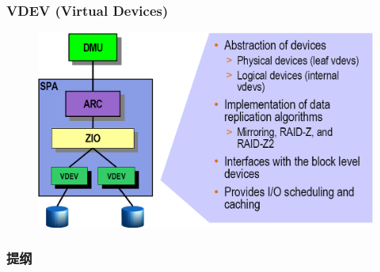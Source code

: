 % 
% 
\begin{frame}[fragile]
    \frametitle{VDEV (Virtual Devices)}
    \begin{figure}
    \includegraphics[width=0.8\linewidth]{figs/ZFS-vdev.png}
    \end{figure}
\end{frame}
% 
% 
\begin{frame}
\frametitle{提纲} %
\tableofcontents %
\end{frame}
